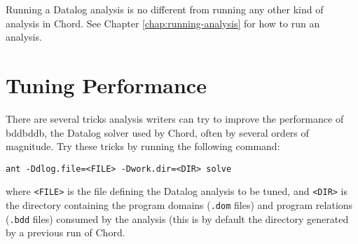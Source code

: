 Running a Datalog analysis is no different from running any other kind of analysis
in Chord.  See Chapter \ref{chap:running-analysis} for how to run an analysis.

\section{Tuning Performance}
\label{sec:tuning-datalog-analysis}

There are several tricks analysis writers can try to improve the
performance of bddbddb, the Datalog solver used by Chord, often
by several orders of magnitude.
Try these tricks by running the following command:

\begin{framed}
\begin{verbatim}
ant -Ddlog.file=<FILE> -Dwork.dir=<DIR> solve
\end{verbatim}
\end{framed}

where {\tt <FILE>} is the file defining the Datalog analysis
to be tuned, and {\tt <DIR>} is the directory containing the
program domains ({\tt *.dom} files) and program relations ({\tt *.bdd} files)
consumed by the analysis (this is by default the
 directory generated
by a previous run of Chord.

